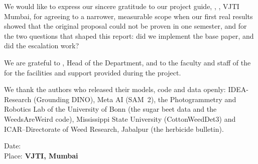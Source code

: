 We would like to express our sincere gratitude to our project guide, \textbf{\guide}, \department,
VJTI Mumbai, for agreeing to a narrower, measurable scope when our first real results showed that the
original proposal could not be proven in one semester, and for the two questions that shaped this
report: did we implement the base paper, and did the escalation work?

We are grateful to \hod{}, Head of the Department, and to the faculty and staff of the \department{} for
the facilities and support provided during the project.

We thank the authors who released their models, code and data openly: IDEA-Research (Grounding DINO),
Meta AI (SAM~2), the Photogrammetry and Robotics Lab of the University of Bonn (the sugar beet data and
the WeedsAreWeird code), Mississippi State University (CottonWeedDet3) and ICAR--Directorate of Weed
Research, Jabalpur (the herbicide bulletin).

\vspace{1cm}
\noindent Date: \submissiondate\\
Place: \textbf{VJTI, Mumbai}
